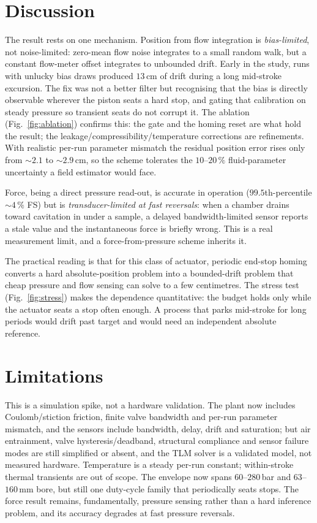 \documentclass[conference]{IEEEtran}
\begin{document}
\section{Discussion}
The result rests on one mechanism. Position from flow integration is
\emph{bias-limited}, not noise-limited: zero-mean flow noise integrates to a small
random walk, but a constant flow-meter offset integrates to unbounded drift. Early
in the study, runs with unlucky bias draws produced $13$\,cm of drift during a
long mid-stroke excursion. The fix was not a better filter but recognising that
the bias is directly observable wherever the piston seats a hard stop, and gating
that calibration on steady pressure so transient seats do not corrupt it. The
ablation (Fig.~\ref{fig:ablation}) confirms this: the gate and the homing reset
are what hold the result; the leakage/compressibility/temperature corrections are
refinements. With realistic per-run parameter mismatch the residual position
error rises only from $\sim 2.1$ to $\sim 2.9$\,cm, so the scheme tolerates the
$10$--$20\,\%$ fluid-parameter uncertainty a field estimator would face.

Force, being a direct pressure read-out, is accurate in operation
($99.5$th-percentile $\sim 4\,\%$ FS) but is \emph{transducer-limited at fast
reversals}: when a chamber drains toward cavitation in under a sample, a delayed
bandwidth-limited sensor reports a stale value and the instantaneous force is
briefly wrong. This is a real measurement limit, and a force-from-pressure scheme
inherits it.

The practical reading is that for this class of actuator, periodic end-stop
homing converts a hard absolute-position problem into a bounded-drift problem that
cheap pressure and flow sensing can solve to a few centimetres. The stress test
(Fig.~\ref{fig:stress}) makes the dependence quantitative: the budget holds only
while the actuator seats a stop often enough. A process that parks mid-stroke for
long periods would drift past target and would need an independent absolute
reference.

\section{Limitations}
This is a simulation spike, not a hardware validation. The plant now includes
Coulomb/stiction friction, finite valve bandwidth and per-run parameter mismatch,
and the sensors include bandwidth, delay, drift and saturation; but air
entrainment, valve hysteresis/deadband, structural compliance and sensor failure
modes are still simplified or absent, and the TLM solver is a validated model,
not measured hardware. Temperature is a steady per-run constant; within-stroke
thermal transients are out of scope. The envelope now spans $60$--$280$\,bar and
$63$--$160$\,mm bore, but still one duty-cycle family that periodically seats
stops. The force result remains, fundamentally, pressure sensing rather than a
hard inference problem, and its accuracy degrades at fast pressure reversals.
\end{document}

